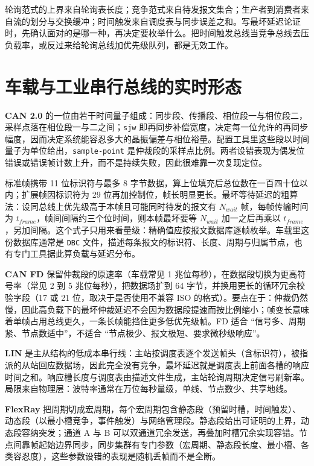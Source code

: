 \documentclass[12pt,a4paper,fontset=fandol]{ctexbook}
\newcommand{\Tp}[1]{\texttt{#1}}
\begin{document}
\begin{compare}[title={四种范式各自的上界来源}]
轮询范式的上界来自轮询表长度；竞争范式来自待发报文集合；生产者到消费者来自流的划分与交换缓冲；时间触发来自调度表与同步误差之和。写最坏延迟论证时，先确认面对的是哪一种，再决定要枚举什么。把时间触发总线当竞争总线去压负载率，或反过来给轮询总线加优先级队列，都是无效工作。
\end{compare}

\section{车载与工业串行总线的实时形态}

\textbf{CAN 2.0} 的一位由若干时间量子组成：同步段、传播段、相位段一与相位段二，采样点落在相位段一与二之间；\Tp{sjw} 即再同步补偿宽度，决定每一位允许的再同步幅度，因而决定系统能容忍多大的晶振偏差与相位裕量。配置工具里这些段以时间量子为单位给出，\Tp{sample-point} 是仲裁段的采样点比例。两者设错表现为偶发位错误或错误帧计数上升，而不是持续失败，因此很难靠一次复现定位。

标准帧携带 11 位标识符与最多 8 字节数据，算上位填充后总位数在一百四十位以内；扩展帧因标识符为 29 位再加控制位，帧长明显更长。最坏等待延迟的粗算法：设同总线上优先级高于本帧且可能同时待发的报文有 $N_{wait}$ 帧，每帧传输时间为 $t_{frame}$，帧间间隔约三个位时间，则本帧最坏要等 $N_{wait}$ 加一之后再乘以 $t_{frame}$，另加间隔。这个式子只用来看量级：精确值应按报文数据库逐帧枚举。车载里这份数据库通常是 \Tp{DBC} 文件，描述每条报文的标识符、长度、周期与归属节点，也有专门工具据此算负载与延迟分布。

\textbf{CAN FD} 保留仲裁段的原速率（车载常见 1 兆位每秒），在数据段切换为更高符号率（常见 2 到 5 兆位每秒），把数据场扩到 64 字节，并换用更长的循环冗余校验字段（17 或 21 位，取决于是否使用不兼容 ISO 的格式）。要点在于：仲裁仍然慢，因此高负载下的最坏仲裁延迟不会因为数据段提速而按比例缩小；帧变长意味着单帧占用总线更久，一条长帧能挡住更多低优先级帧。FD 适合 ``信号多、周期紧、节点数适中''，不适合 ``节点极少、报文极短、要求微秒级响应''。

\textbf{LIN} 是主从结构的低成本串行线：主站按调度表逐个发送帧头（含标识符），被指派的从站回应数据场，因此完全没有竞争，最坏延迟就是调度表上前面各槽的响应时间之和。响应槽长度与调度表由描述文件生成，主站轮询周期决定信号刷新率。局限来自物理层：波特率通常在万位每秒量级，单线、节点数少、共享地线。

\textbf{FlexRay} 把周期切成宏周期，每个宏周期包含静态段（预留时槽，时间触发）、动态段（以最小槽竞争，事件触发）与网络管理段。静态段给出可证明的上界，动态段容纳突发；通道 A 与 B 可以双通道冗余发送，再叠加时槽冗余实现容错。节点间靠帧起始边界同步，同步集群有专门参数（宏周期、静态段长度、最小槽、各类容忍度），这些参数设错的表现是随机丢帧而不是全断。
\end{document}
